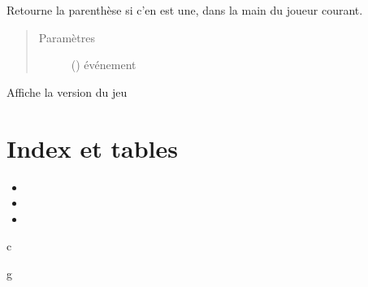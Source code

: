 \documentclass[letterpaper,10pt,french]{sphinxmanual}
\begin{document}
\begin{fulllineitems}
\begin{fulllineitems}
\begin{quote}
\begin{description}
\end{description}\end{quote}

\end{fulllineitems}


\begin{fulllineitems}
\label{\detokenize{doc_classe:gui.ErgoGui.switch}}
Retourne la parenthèse si c’en est une, dans la main du joueur
courant.
\begin{quote}\begin{description}
\item[{Paramètres}] \leavevmode
{} () \textendash{} événement

\end{description}\end{quote}

\end{fulllineitems}


\begin{fulllineitems}
\label{\detokenize{doc_classe:gui.ErgoGui.version}}
Affiche la version du jeu

\end{fulllineitems}


\end{fulllineitems}



\chapter{Index et tables}
\label{\detokenize{index:index-et-tables}}\begin{itemize}
\item {} 

\item {} 

\item {} 

\end{itemize}


\renewcommand{\indexname}{Index des modules Python}
\begin{sphinxtheindex}
\def\bigletter#1{{\Large\sffamily#1}\nopagebreak\vspace{1mm}}
\bigletter{c}
\item {}
\indexspace
\bigletter{g}
\item {}
\end{sphinxtheindex}

\renewcommand{\indexname}{Index}
\printindex
\end{document}
